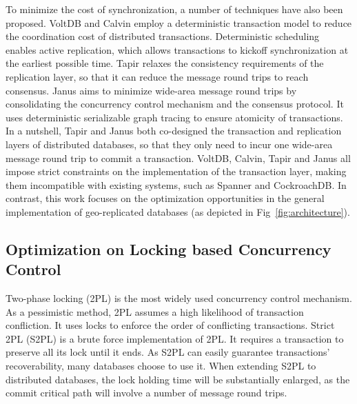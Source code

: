 \documentclass[conference]{IEEEtran}
\begin{document}
To minimize the cost of synchronization, a number of techniques have also been proposed.
VoltDB \cite{VoltDB} and Calvin \cite{Calvin:conf/sigmod/ThomsonDWRSA12} employ a deterministic transaction model
to reduce the coordination cost of distributed transactions.
Deterministic scheduling enables active replication, which allows transactions to kickoff synchronization at the earliest possible time.
Tapir \cite{Tapir:conf/sosp/ZhangSSKP15} relaxes the consistency requirements of the replication layer, so that it can reduce the message round trips to reach consensus.
Janus \cite{Janus:conf/osdi/MuNLL16} aims to minimize wide-area message round trips
by consolidating the concurrency control mechanism and the consensus protocol.
It uses deterministic serializable graph tracing to ensure atomicity of transactions.
In a nutshell, Tapir and Janus both co-designed the transaction and replication layers of distributed databases, so that they only need to incur one wide-area message round trip to commit a transaction.
VoltDB, Calvin, Tapir and Janus all impose strict constraints on the implementation of the transaction layer, making them incompatible with existing systems, such as Spanner and CockroachDB.
In contrast, this work focuses on the optimization opportunities in the general implementation of geo-replicated databases (as depicted in Fig~\ref{fig:architecture}).

\subsection{Optimization on Locking based Concurrency Control}
Two-phase locking (2PL) is the most widely used concurrency control mechanism.
As a pessimistic method, 2PL assumes a high likelihood of transaction confliction.
It uses locks to enforce the order of conflicting transactions.
Strict 2PL (S2PL) is a brute force implementation of 2PL. 
It requires a transaction to preserve all its lock until it ends.
As S2PL can easily guarantee transactions' recoverability, many databases choose to use it.
When extending S2PL to distributed databases, the lock holding time will be substantially enlarged, 
as the commit critical path will involve a number of message round trips.
\end{document}
